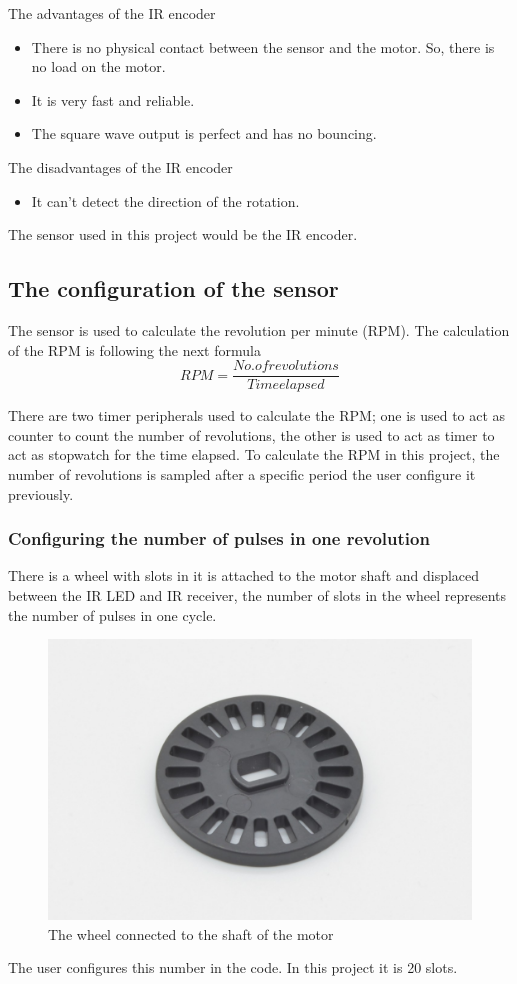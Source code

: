 The advantages of the IR encoder
\begin{itemize}
    \item There is no physical contact between the sensor and the motor. So, there is no load on the motor.
    \item It is very fast and reliable.
    \item The square wave output is perfect and has no bouncing.
\end{itemize}

The disadvantages of the IR encoder
\begin{itemize}
    \item It can’t detect the direction of the rotation.
\end{itemize}
The sensor used in this project would be the IR encoder.

\subsection{The configuration of the sensor}
The  sensor is used to calculate the revolution per minute (RPM).
The calculation of the RPM is following the next formula
\[ RPM = \frac{No. of revolutions}{Time elapsed}\]

There are two timer peripherals used to calculate the RPM; one is used to act as counter to count the number of revolutions, the other is used to act as timer to act as stopwatch for the time elapsed.
To calculate the RPM in this project, the number of revolutions is sampled after a specific period the user configure it previously.

\clearpage
\subsubsection{Configuring the number of pulses in one revolution}

There is a wheel with slots in it is attached to the motor shaft and displaced between the IR LED and IR receiver, the number of slots in the wheel represents the number of pulses in one cycle.
\begin{figure}[h]
    \centering
    \includegraphics[scale=.2]{figuresEncoder/5.jpeg}
    \caption{The wheel connected to the shaft of the motor}
\end{figure}
The user configures this number in the code. In this project it is 20 slots.

